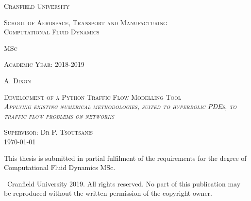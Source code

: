\thispagestyle{empty}

\begin{center}

\vfill

\LARGE \textsc{Cranfield University}

\vfill

\large\textsc{School of Aerospace, Transport and Manufacturing}\\
\large\textsc{Computational Fluid Dynamics}

\vfill

\large\textsc{MSc}

\vfill

\large\textsc{Academic Year: 2018-2019}

\vfill

\LARGE\textsc{A. Dixon}

\vfill

\LARGE\textsc{Development of a Python Traffic Flow Modelling Tool}\\
\vspace{0.5cm}
\large\textsc{\emph{Applying existing numerical methodologies, suited to hyperbolic PDEs, to traffic flow problems on networks}}

\vfill

\large\textsc{Supervisor: Dr P. Tsoutsanis}\\
\large\textsc{\monthyeardate\today}

\normalsize
\vfill

This thesis is submitted in partial fulfilment of the requirements for the degree of Computational Fluid Dynamics MSc.

\vfill

\textcopyright\ Cranfield University 2019. All rights reserved. No part of this publication may be reproduced without the written permission of the copyright owner.

\end{center} 

\pagebreak

\thispagestyle{empty}

\mbox

\pagebreak





\mbox{} \vspace{25mm}

